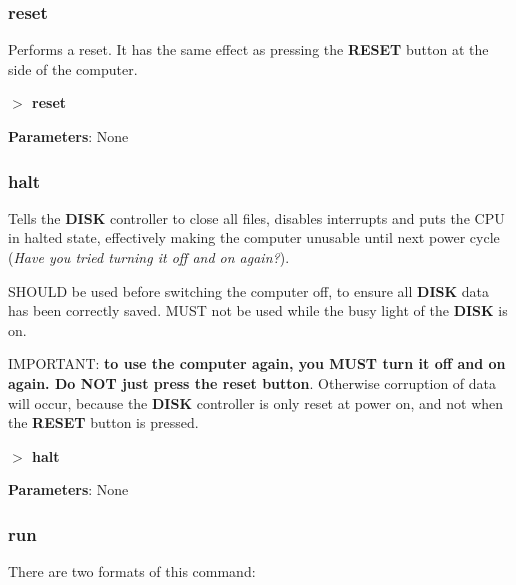 \documentclass[a4paper,11pt]{article}
\begin{document}
        \subsubsection{{\color{blue}reset}}
        Performs a reset. It has the same effect as pressing the
        \textbf{RESET} button at the side of the computer.

        \hspace{1.9cm}\textbf{$>$ reset}

        \textbf{Parameters}: None

        \subsubsection{{\color{blue}halt}}
        Tells the \textbf{DISK} controller to close all files, disables
        interrupts and puts the CPU in halted state, effectively making the
        computer unusable until next power cycle (\textit{Have you tried turning
        it off and on again?}).

        SHOULD be used before switching the computer off, to ensure all
        \textbf{DISK} data has been correctly saved. MUST not be used while the
        busy light of the \textbf{DISK} is on.

        IMPORTANT: \textbf{to use the computer again, you MUST turn it off and
        on again. Do NOT just press the reset button}. Otherwise corruption of
        data will occur, because the \textbf{DISK} controller is only reset at
        power on, and not when the \textbf{RESET} button is pressed.

        \hspace{1.9cm}\textbf{$>$ halt}

        \textbf{Parameters}: None

        \subsubsection{{\color{blue}run}}
        There are two formats of this command:
\end{document}
